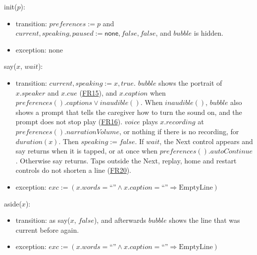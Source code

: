 \documentclass[10pt, titlepage]{article}
\newcommand{\srsurl}{https://team-hindsight.github.io/ophthamology-game/SRS/SRS.pdf}
\newcommand{\srsitemref}[2]{\href{\srsurl\#nameddest=#1}{#2}}
\newcommand{\T}[1]{\mathit{#1}}          %
\newcommand{\V}[1]{\mathsf{#1}}          %
\newcommand{\exc}{\mathit{exc}}
\newcommand{\true}{\mathit{true}}
\newcommand{\false}{\mathit{false}}
\begin{document}
\begin{samepage}
\noindent init($p$):
\begin{itemize}
\item transition: $\T{preferences} := p$ and
  $\T{current}, \T{speaking}, \T{paused} := \V{none}, \false,
  \false$, and $\T{bubble}$ is hidden.
\item exception: none
\end{itemize}
\end{samepage}
\par\pagebreak[0]

\begin{samepage}
\noindent say($x$, $\T{wait}$):
\begin{itemize}
\item transition: $\T{current}, \T{speaking} := x, \true$. $\T{bubble}$ shows
  the portrait of $x.\T{speaker}$ and $x.\T{cue}$
  (\srsitemref{FR_VisualCues}{FR15}), and $x.\T{caption}$ when
  $\T{preferences}().\T{captions} \vee \T{inaudible}()$. When
  $\T{inaudible}()$, $\T{bubble}$ also shows a prompt that tells the caregiver
  how to turn the sound on, and the prompt does not stop play
  (\srsitemref{FR_NarrationFallback}{FR16}). $\T{voice}$ plays $x.\T{recording}$
  at $\T{preferences}().\T{narrationVolume}$, or nothing if there is no
  recording, for $\T{duration}(x)$. Then $\T{speaking} := \false$. If
  $\T{wait}$, the Next control appears and say returns when it is tapped, or at
  once when $\T{preferences}().\T{autoContinue}$. Otherwise say returns. Taps
  outside the Next, replay, home and restart controls do not shorten a line
  (\srsitemref{FR_IgnoreRepeatedTouches}{FR20}).
\item exception: $\exc := (x.\T{words} = \text{``''} \wedge x.\T{caption} =
  \text{``''} \Rightarrow \text{EmptyLine})$
\end{itemize}
\end{samepage}
\par\pagebreak[0]

\begin{samepage}
\noindent aside($x$):
\begin{itemize}
\item transition: as say($x$, $\false$), and afterwards $\T{bubble}$ shows the
  line that was current before again.
\item exception: $\exc := (x.\T{words} = \text{``''} \wedge x.\T{caption} =
  \text{``''} \Rightarrow \text{EmptyLine})$
\end{itemize}
\end{samepage}
\par\pagebreak[0]
\end{document}
